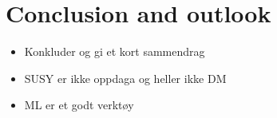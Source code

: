 \chapter{Conclusion and outlook}
\label{sec:Conclusion}

\begin{itemize}
    \item Konkluder og gi et kort sammendrag
    \item SUSY er ikke oppdaga og heller ikke DM
    \item ML er et godt verktøy
\end{itemize}